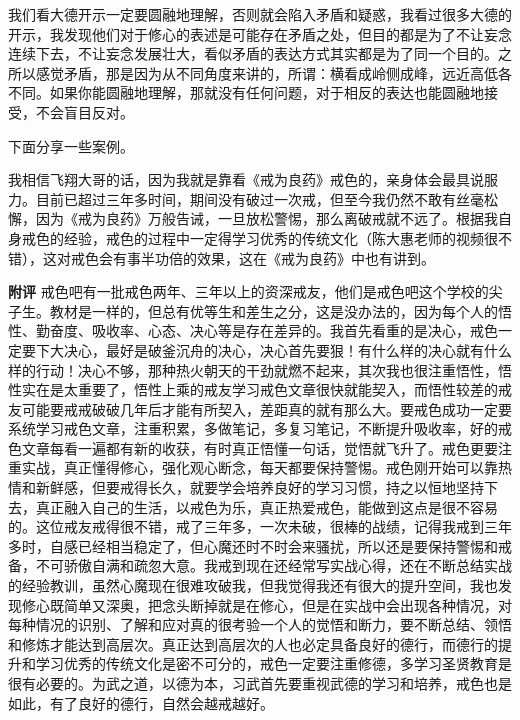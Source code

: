 我们看大德开示一定要圆融地理解，否则就会陷入矛盾和疑惑，我看过很多大德的开示，我发现他们对于修心的表述是可能存在矛盾之处，但目的都是为了不让妄念连续下去，不让妄念发展壮大，看似矛盾的表达方式其实都是为了同一个目的。之所以感觉矛盾，那是因为从不同角度来讲的，所谓：横看成岭侧成峰，远近高低各不同。如果你能圆融地理解，那就没有任何问题，对于相反的表达也能圆融地接受，不会盲目反对。

下面分享一些案例。

\begin{case}
    我相信飞翔大哥的话，因为我就是靠看《戒为良药》戒色的，亲身体会最具说服力。目前已超过三年多时间，期间没有破过一次戒，但至今我仍然不敢有丝毫松懈，因为《戒为良药》万般告诫，一旦放松警惕，那么离破戒就不远了。根据我自身戒色的经验，戒色的过程中一定得学习优秀的传统文化（陈大惠老师的视频很不错），这对戒色会有事半功倍的效果，这在《戒为良药》中也有讲到。

    \textbf{附评} 戒色吧有一批戒色两年、三年以上的资深戒友，他们是戒色吧这个学校的尖子生。教材是一样的，但总有优等生和差生之分，这是没办法的，因为每个人的悟性、勤奋度、吸收率、心态、决心等是存在差异的。我首先看重的是决心，戒色一定要下大决心，最好是破釜沉舟的决心，决心首先要狠！有什么样的决心就有什么样的行动！决心不够，那种热火朝天的干劲就燃不起来，其次我也很注重悟性，悟性实在是太重要了，悟性上乘的戒友学习戒色文章很快就能契入，而悟性较差的戒友可能要戒戒破破几年后才能有所契入，差距真的就有那么大。要戒色成功一定要系统学习戒色文章，注重积累，多做笔记，多复习笔记，不断提升吸收率，好的戒色文章每看一遍都有新的收获，有时真正悟懂一句话，觉悟就飞升了。戒色更要注重实战，真正懂得修心，强化观心断念，每天都要保持警惕。戒色刚开始可以靠热情和新鲜感，但要戒得长久，就要学会培养良好的学习习惯，持之以恒地坚持下去，真正融入自己的生活，以戒色为乐，真正热爱戒色，能做到这点是很不容易的。这位戒友戒得很不错，戒了三年多，一次未破，很棒的战绩，记得我戒到三年多时，自感已经相当稳定了，但心魔还时不时会来骚扰，所以还是要保持警惕和戒备，不可骄傲自满和疏忽大意。我戒到现在还经常写实战心得，还在不断总结实战的经验教训，虽然心魔现在很难攻破我，但我觉得我还有很大的提升空间，我也发现修心既简单又深奥，把念头断掉就是在修心，但是在实战中会出现各种情况，对每种情况的识别、了解和应对真的很考验一个人的觉悟和断力，要不断总结、领悟和修炼才能达到高层次。真正达到高层次的人也必定具备良好的德行，而德行的提升和学习优秀的传统文化是密不可分的，戒色一定要注重修德，多学习圣贤教育是很有必要的。为武之道，以德为本，习武首先要重视武德的学习和培养，戒色也是如此，有了良好的德行，自然会越戒越好。
\end{case}

